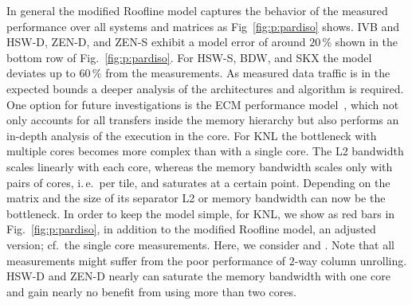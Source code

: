 In general the modified Roofline model captures the behavior of the measured
performance over all systems and matrices as Fig~\ref{fig:p:pardiso} shows.
%
%
IVB and HSW-D, ZEN-D, and ZEN-S exhibit a model error of around $20$\,\% shown
in the bottom row of Fig.~\ref{fig:p:pardiso}. 
For HSW-S, BDW, and SKX the model deviates up to $60$\,\% from the measurements.
%
%
As measured data traffic is in the expected bounds a deeper analysis of the
architectures and algorithm is required.
One option for future investigations is the ECM performance
model~\cite{hager-2012-ecm}, which not only accounts for all transfers inside
the memory hierarchy but also performs an in-depth analysis of the execution in
the core.
%
%
For KNL the bottleneck with multiple cores becomes more complex than with a
single core.
The L2 bandwidth scales linearly with each core, whereas the memory bandwidth
scales only with pairs of cores, i.\,e.\ per tile, and saturates at a certain
point.
Depending on the matrix and the size of its separator L2 or memory bandwidth can
now be the bottleneck.
%
In order to keep the model simple, for KNL, we show
as red bars in Fig.~\ref{fig:p:pardiso},
in addition
to the modified
Roofline model, 
an adjusted version; cf.\ the single core measurements.
Here, we consider  and .
Note that all measurements might suffer from the poor performance of $2$-way
column unrolling.
%
% 
HSW-D and ZEN-D nearly can saturate the memory bandwidth with one core and gain
nearly no benefit from using more than two cores.









